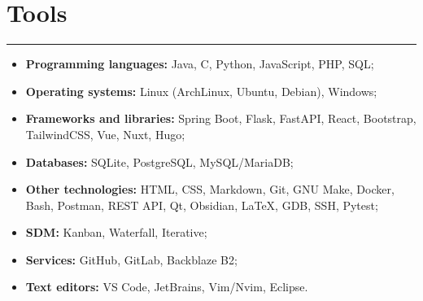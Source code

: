 \section*{Tools}
\par\noindent\rule{\textwidth}{0.1mm}

\begin{itemize}
    \item \textbf{Programming languages:} Java, C, Python, JavaScript, PHP, SQL;
    \item \textbf{Operating systems:} Linux (ArchLinux, Ubuntu, Debian), Windows;
    \item \textbf{Frameworks and libraries:} Spring Boot, Flask, FastAPI, React, Bootstrap, TailwindCSS, Vue, Nuxt, Hugo;
    \item \textbf{Databases:} SQLite, PostgreSQL, MySQL/MariaDB;
    \item \textbf{Other technologies:} HTML, CSS, Markdown, Git, GNU Make, Docker, Bash, Postman,
        REST API, Qt, Obsidian, \LaTeX, GDB, SSH, Pytest;
    \item \textbf{SDM:} Kanban, Waterfall, Iterative;
    \item \textbf{Services:} GitHub, GitLab, Backblaze B2; 
    \item \textbf{Text editors:} VS Code, JetBrains, Vim/Nvim, Eclipse.
\end{itemize}

